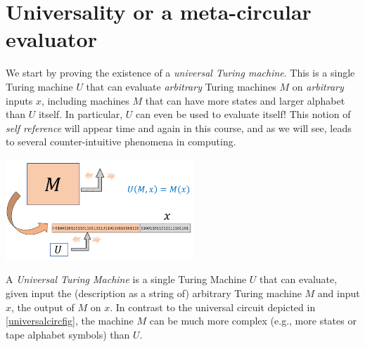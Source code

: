 \section{Universality or a meta-circular
evaluator}\label{Universality-or-a-meta-ci}

We start by proving the existence of a \emph{universal Turing machine}.
This is a single Turing machine \(U\) that can evaluate \emph{arbitrary}
Turing machines \(M\) on \emph{arbitrary} inputs \(x\), including
machines \(M\) that can have more states and larger alphabet than \(U\)
itself. In particular, \(U\) can even be used to evaluate itself! This
notion of \emph{self reference} will appear time and again in this
course, and as we will see, leads to several counter-intuitive phenomena
in computing.

\hypertarget{universaltmthm}{}


\begin{marginfigure}
\centering
\includegraphics[width=\linewidth, height=1.5in, keepaspectratio]{../figure/universaltm.png}
\caption{A \emph{Universal Turing Machine} is a single Turing Machine
\(U\) that can evaluate, given input the (description as a string of)
arbitrary Turing machine \(M\) and input \(x\), the output of \(M\) on
\(x\). In contrast to the universal circuit depicted in
\cref{universalcircfig}, the machine \(M\) can be much more complex
(e.g., more states or tape alphabet symbols) than \(U\).}
\label{universaltmfig}
\end{marginfigure}

